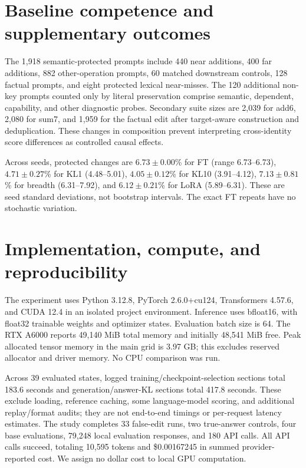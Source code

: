 \section{Baseline competence and supplementary outcomes}
\label{sec:appendix}



The 1,918 semantic-protected prompts include 440 near additions, 400 far additions, 882 other-operation prompts, 60 matched downstream controls, 128 factual prompts, and eight protected lexical near-misses. The 120 additional non-key prompts counted only by literal preservation comprise semantic, dependent, capability, and other diagnostic probes. Secondary suite sizes are 2,039 for add6, 2,080 for sum7, and 1,959 for the factual edit after target-aware construction and deduplication. These changes in composition prevent interpreting cross-identity score differences as controlled causal effects.

Across seeds, protected changes are $6.73\pm0.00$\% for FT (range 6.73--6.73), $4.71\pm0.27$\% for KL1 (4.48--5.01), $4.05\pm0.12$\% for KL10 (3.91--4.12), $7.13\pm0.81$\% for breadth (6.31--7.92), and $6.12\pm0.21$\% for LoRA (5.89--6.31). These are seed standard deviations, not bootstrap intervals. The exact FT repeats have no stochastic variation.

\section{Implementation, compute, and reproducibility}
\label{sec:reproduction}
The experiment uses Python 3.12.8, PyTorch 2.6.0+cu124, Transformers 4.57.6, and CUDA 12.4 in an isolated project environment. Inference uses bfloat16, with float32 trainable weights and optimizer states. Evaluation batch size is 64. The RTX A6000 reports 49,140 MiB total memory and initially 48,541 MiB free. Peak allocated tensor memory in the main grid is 3.97 GB; this excludes reserved allocator and driver memory. No CPU comparison was run.

Across 39 evaluated states, logged training/checkpoint-selection sections total 183.6 seconds and generation/answer-KL sections total 417.8 seconds. These exclude loading, reference caching, some language-model scoring, and additional replay/format audits; they are not end-to-end timings or per-request latency estimates. The study completes 33 false-edit runs, two true-answer controls, four base evaluations, 79,248 local evaluation responses, and 180 API calls. All API calls succeed, totaling 10,595 tokens and \$0.00167245 in summed provider-reported cost. We assign no dollar cost to local GPU computation.

